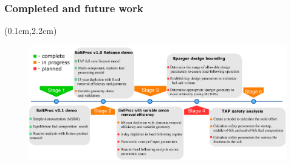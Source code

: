 \begin{frame}
\frametitle{Completed and future work}       
\begin{textblock*}{12.5cm}(0.1cm,2.2cm) %
	\begin{figure}[ht!] %
		\includegraphics[width=\textwidth]{./images/progress_chart_larger.pdf} 
	\end{figure}
\end{textblock*}
\end{frame}

